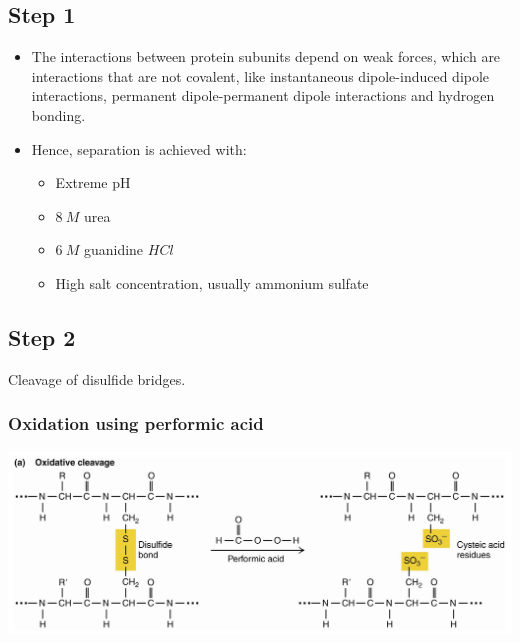 \documentclass[11pt]{article}
\begin{document}
\subsection{Step 1}
\label{sec:orga1b098a}
\begin{itemize}
\item The interactions between protein subunits depend on weak forces, which are interactions that are not covalent, like instantaneous dipole-induced dipole interactions, permanent dipole-permanent dipole interactions and hydrogen bonding.
\item Hence, separation is achieved with:
\begin{itemize}
\item Extreme pH
\item \(\qty{8}{\unit{M}}\) urea
\item \(\qty{6}{\unit{M}}\) guanidine \(HCl\)
\item High salt concentration, usually ammonium sulfate
\end{itemize}
\end{itemize}

\newpage
\subsection{Step 2}
\label{sec:org66fdbe0}
Cleavage of disulfide bridges.
\subsubsection{Oxidation using performic acid}
\label{sec:orga04fded}
\begin{center}
\includegraphics[width=.9\linewidth]{./images/oxidative-cleavage.png}
\end{center}
\end{document}
